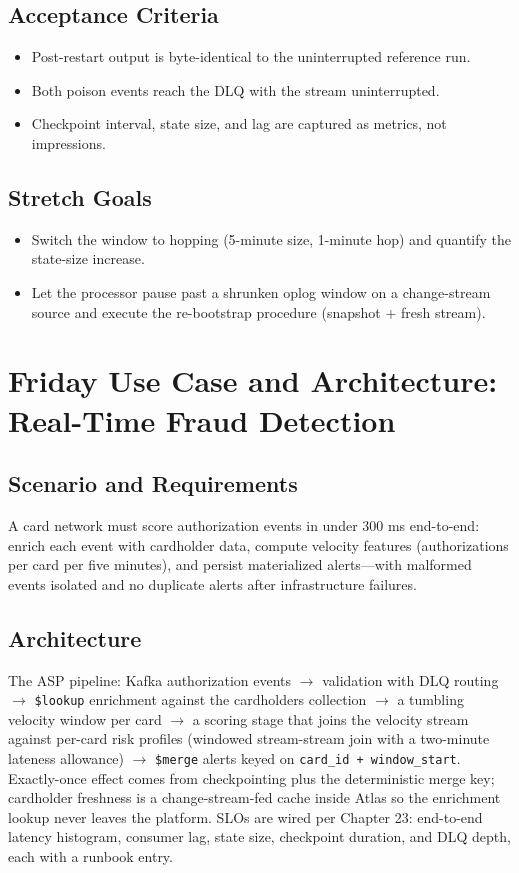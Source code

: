 \subsection*{Acceptance Criteria}
\begin{itemize}
    \item Post-restart output is byte-identical to the uninterrupted reference run.
    \item Both poison events reach the DLQ with the stream uninterrupted.
    \item Checkpoint interval, state size, and lag are captured as metrics, not impressions.
\end{itemize}

\subsection*{Stretch Goals}
\begin{itemize}
    \item Switch the window to hopping (5-minute size, 1-minute hop) and quantify the state-size increase.
    \item Let the processor pause past a shrunken oplog window on a change-stream source and execute the re-bootstrap procedure (snapshot + fresh stream).
\end{itemize}

\section{Friday Use Case and Architecture: Real-Time Fraud Detection}
\subsection{Scenario and Requirements}
A card network must score authorization events in under 300 ms end-to-end: enrich each event with cardholder data, compute velocity features (authorizations per card per five minutes), and persist materialized alerts---with malformed events isolated and no duplicate alerts after infrastructure failures.

\subsection{Architecture}
The ASP pipeline: Kafka authorization events $\to$ validation with DLQ routing $\to$ \texttt{\$lookup} enrichment against the cardholders collection $\to$ a tumbling velocity window per card $\to$ a scoring stage that joins the velocity stream against per-card risk profiles (windowed stream-stream join with a two-minute lateness allowance) $\to$ \texttt{\$merge} alerts keyed on \texttt{card\_id + window\_start}. Exactly-once effect comes from checkpointing plus the deterministic merge key; cardholder freshness is a change-stream-fed cache inside Atlas so the enrichment lookup never leaves the platform. SLOs are wired per Chapter 23: end-to-end latency histogram, consumer lag, state size, checkpoint duration, and DLQ depth, each with a runbook entry.

